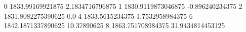 0 1833.99169921875 2.1834716796875
1 1830.9119873046875 -0.896240234375
2 1831.8082275390625 0.0
4 1833.5615234375 1.7532958984375
6 1842.1871337890625 10.37890625
8 1863.751708984375 31.9434814453125
